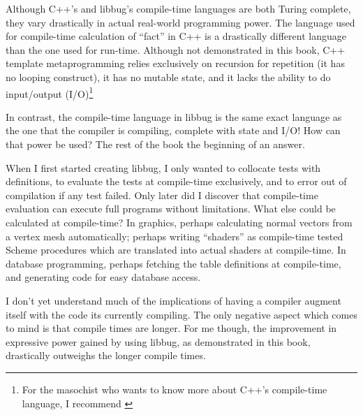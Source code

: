  Although C++'s and libbug's compile-time languages are both Turing complete,
 they vary drastically in actual real-world programming power.  The language used
 for compile-time calculation of ``fact'' in C++ is a drastically different language than
 the one used for run-time.  Although not demonstrated in this book,
 C++ template metaprogramming relies exclusively on recursion for repetition (it has no
 looping construct), it has no mutable state, and it lacks the ability to do input/output
 (I/O)\footnote{For the masochist who wants to know more about C++'s compile-time language,
 I recommend \cite{ctm} }

 In contrast, the compile-time
 language in libbug is the same exact language as the one that the compiler
 is compiling, complete with state and I/O!  How can that power be used?
 The rest of the book the beginning of an answer.


 When I first started creating libbug, I only wanted to collocate
 tests with definitions, to evaluate the tests at compile-time exclusively, and to error out
 of compilation
 if any test failed.  Only later did I discover that compile-time evaluation
 can execute full programs without limitations.  What else could be
 calculated at compile-time?  In graphics, perhaps calculating normal vectors
 from a vertex mesh automatically; perhaps writing ``shaders'' as compile-time
 tested Scheme procedures which are translated into actual shaders at compile-time.
 In database programming, perhaps fetching the table definitions at compile-time,
 and generating code for easy database access.

 I don't yet understand much of the implications of having a compiler augment itself
 with the code its currently compiling.  The only negative aspect which comes to mind
 is that compile times are longer.  For me though, the improvement in
 expressive power gained by using libbug,
 as demonstrated in this book,
 drastically outweighs the longer compile times.




